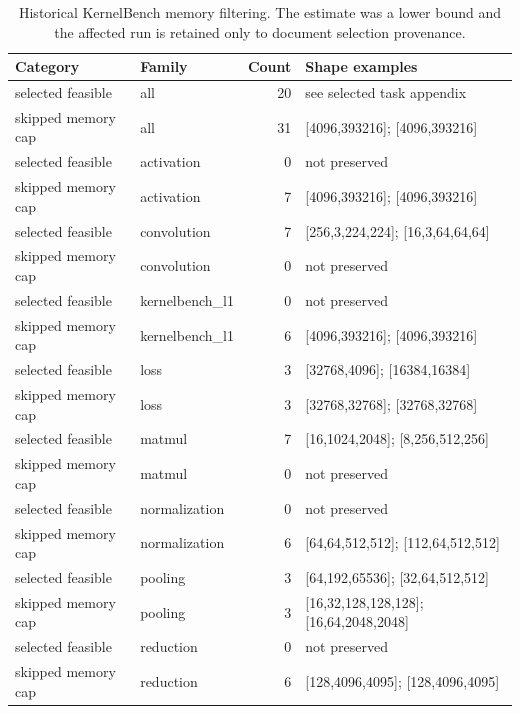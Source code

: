 \begin{table}[htbp]
\centering
\caption{Historical KernelBench memory filtering. The estimate was a lower bound and the affected run is retained only to document selection provenance.}
\label{tab:kernelbench-memory-filter}
\scriptsize
\begin{tabularx}{\linewidth}{l l r X}
\toprule
Category & Family & Count & Shape examples \\
\midrule
selected feasible & all & 20 & see selected task appendix \\
skipped memory cap & all & 31 & [4096,393216]; [4096,393216] \\
selected feasible & activation & 0 & not preserved \\
skipped memory cap & activation & 7 & [4096,393216]; [4096,393216] \\
selected feasible & convolution & 7 & [256,3,224,224]; [16,3,64,64,64] \\
skipped memory cap & convolution & 0 & not preserved \\
selected feasible & kernelbench\_l1 & 0 & not preserved \\
skipped memory cap & kernelbench\_l1 & 6 & [4096,393216]; [4096,393216] \\
selected feasible & loss & 3 & [32768,4096]; [16384,16384] \\
skipped memory cap & loss & 3 & [32768,32768]; [32768,32768] \\
selected feasible & matmul & 7 & [16,1024,2048]; [8,256,512,256] \\
skipped memory cap & matmul & 0 & not preserved \\
selected feasible & normalization & 0 & not preserved \\
skipped memory cap & normalization & 6 & [64,64,512,512]; [112,64,512,512] \\
selected feasible & pooling & 3 & [64,192,65536]; [32,64,512,512] \\
skipped memory cap & pooling & 3 & [16,32,128,128,128]; [16,64,2048,2048] \\
selected feasible & reduction & 0 & not preserved \\
skipped memory cap & reduction & 6 & [128,4096,4095]; [128,4096,4095] \\
\bottomrule
\end{tabularx}
\end{table}
